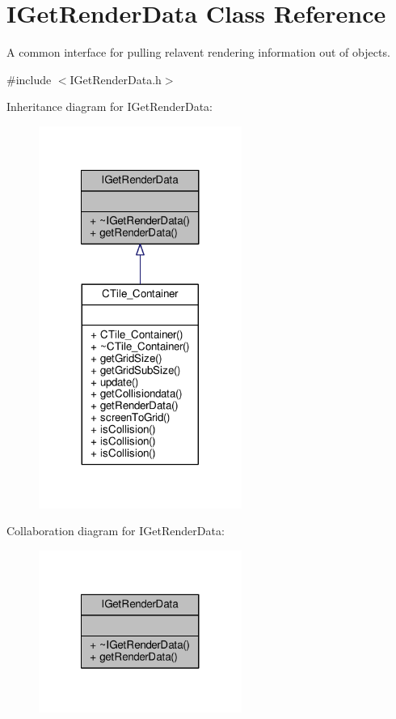 \hypertarget{classIGetRenderData}{\section{I\-Get\-Render\-Data Class Reference}
\label{classIGetRenderData}
}


A common interface for pulling relavent rendering information out of objects.  




{\ttfamily \#include $<$I\-Get\-Render\-Data.\-h$>$}



Inheritance diagram for I\-Get\-Render\-Data\-:\nopagebreak
\begin{figure}[H]
\begin{center}
\leavevmode
\includegraphics[width=188pt]{classIGetRenderData__inherit__graph}
\end{center}
\end{figure}


Collaboration diagram for I\-Get\-Render\-Data\-:\nopagebreak
\begin{figure}[H]
\begin{center}
\leavevmode
\includegraphics[width=188pt]{classIGetRenderData__coll__graph}
\end{center}
\end{figure}
